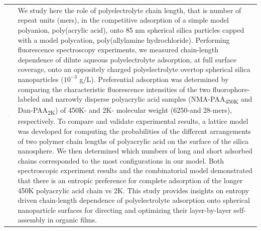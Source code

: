 \documentclass[twoside,twocolumn,9pt]{article}
\begin{document}
\begin{@twocolumnfalse}
\begin{tabular}{m{4.5cm} p{13.5cm} }
\includegraphics{head_foot/dates} & \noindent\normalsize{We study here the role of polyelectrolyte chain length, that is number of repeat units (mers), in the competitive adsorption of a simple model polyanion, poly(acrylic acid), onto 85 nm spherical silica particles capped with a model polycation, poly(allylamine   hydrochloride). Performing fluorescence spectroscopy experiments, we measured chain-length dependence of dilute aqueous polyelectrolyte adsorption, at full surface coverage, onto an oppositely charged polyelectrolyte overtop spherical silica nanoparticles ($10^{-3}$ g/L). Preferential adsorption was determined by comparing the characteristic fluorescence intensities  of the  two  fluorophore-labeled  and narrowly disperse polyacrylic acid samples (NMA-PAA\textsubscript{450K}  and Dan-PAA\textsubscript{2K}) of 450K- and 2K- molecular weight (6250-and 28-mers), respectively. To compare and validate experimental results, a lattice model was developed for computing the probabilities of the different arrangements of two polymer chain lengths of polyacrylic  acid  on  the  surface  of  the  silica  nanosphere. We then determined which numbers of long and short adsorbed chains corresponded to the most configurations in our model. Both spectroscopic experiment results and the combinatorial model demonstrated that there is an entropic preference for complete adsorption of the longer 450K polyacrylic acid chain  vs  2K. This study provides insights on entropy driven chain-length  dependence of polyelectrolyte adsorption onto spherical nanoparticle surfaces for directing and optimizing their  layer-by-layer self-assembly in organic films.}\\

\end{tabular}

 \end{@twocolumnfalse} \vspace{0.6cm}
\end{document}
